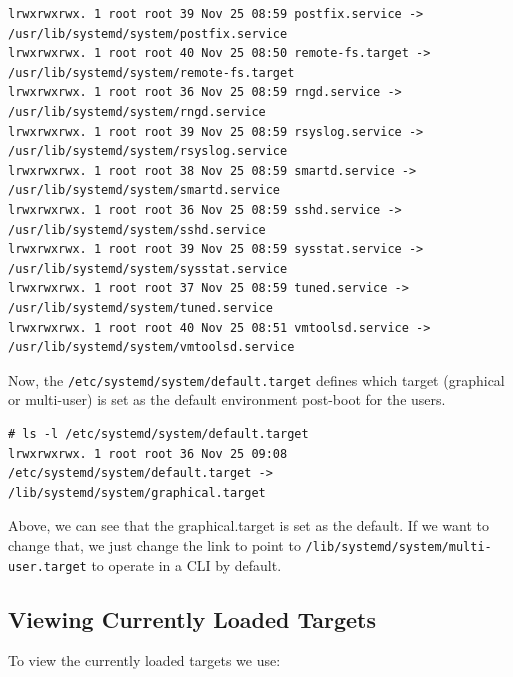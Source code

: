 \begin{verbatim}
lrwxrwxrwx. 1 root root 39 Nov 25 08:59 postfix.service -> /usr/lib/systemd/system/postfix.service
lrwxrwxrwx. 1 root root 40 Nov 25 08:50 remote-fs.target -> /usr/lib/systemd/system/remote-fs.target
lrwxrwxrwx. 1 root root 36 Nov 25 08:59 rngd.service -> /usr/lib/systemd/system/rngd.service
lrwxrwxrwx. 1 root root 39 Nov 25 08:59 rsyslog.service -> /usr/lib/systemd/system/rsyslog.service
lrwxrwxrwx. 1 root root 38 Nov 25 08:59 smartd.service -> /usr/lib/systemd/system/smartd.service
lrwxrwxrwx. 1 root root 36 Nov 25 08:59 sshd.service -> /usr/lib/systemd/system/sshd.service
lrwxrwxrwx. 1 root root 39 Nov 25 08:59 sysstat.service -> /usr/lib/systemd/system/sysstat.service
lrwxrwxrwx. 1 root root 37 Nov 25 08:59 tuned.service -> /usr/lib/systemd/system/tuned.service
lrwxrwxrwx. 1 root root 40 Nov 25 08:51 vmtoolsd.service -> /usr/lib/systemd/system/vmtoolsd.service
\end{verbatim}
\vspace{-10pt}

\noindent
Now, the \verb|/etc/systemd/system/default.target| defines which target (graphical or multi-user) is set as the default environment post-boot for the users.

\vspace{-15pt}
\begin{verbatim}
# ls -l /etc/systemd/system/default.target
lrwxrwxrwx. 1 root root 36 Nov 25 09:08 /etc/systemd/system/default.target -> /lib/systemd/system/graphical.target
\end{verbatim}
\vspace{-10pt}

\noindent
Above, we can see that the graphical.target is set as the default. If we want to change that, we just change the link to point to \verb|/lib/systemd/system/multi-user.target| to operate in a CLI by default. 

\subsection{Viewing Currently Loaded Targets}
To view the currently loaded targets we use:

